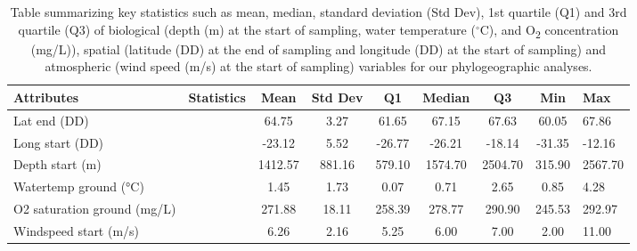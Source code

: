 {\begin{table}[ht]
\centering
\begin{tabular}{|l|l|c|c|c|c|c|c|}
\hline
\textbf{Attributes} & \textbf{Statistics} & \textbf{Mean} & \textbf{Std Dev} & \textbf{Q1} & \textbf{Median} & \textbf{Q3} & \textbf{Min} & \textbf{Max} \\ \hline
Lat end (DD)        &                     & 64.75         & 3.27             & 61.65       & 67.15           & 67.63       & 60.05        & 67.86        \\ \hline
Long start (DD)     &                     & -23.12        & 5.52             & -26.77      & -26.21          & -18.14      & -31.35       & -12.16       \\ \hline
Depth start (m)     &                     & 1412.57       & 881.16           & 579.10      & 1574.70         & 2504.70     & 315.90       & 2567.70      \\ \hline
Watertemp ground (°C) &                   & 1.45          & 1.73             & 0.07        & 0.71            & 2.65        & 0.85         & 4.28         \\ \hline
O2 saturation ground (mg/L) &             & 271.88        & 18.11            & 258.39      & 278.77          & 290.90      & 245.53       & 292.97       \\ \hline
Windspeed start (m/s) &                    & 6.26          & 2.16             & 5.25        & 6.00            & 7.00        & 2.00         & 11.00        \\ \hline
\end{tabular}
\caption{Table summarizing key statistics such as mean, median, standard deviation (Std Dev), 1st quartile (Q1) and 3rd quartile (Q3) of biological (depth (m) at the start of sampling, water temperature ($^\circ$C), and O\textsubscript{2} concentration (mg/L)), spatial (latitude (DD) at the end of sampling and longitude (DD) at the start of sampling) and atmospheric (wind speed (m/s) at the start of sampling) variables for our phylogeographic analyses. \label{fig:tab1}}
\end{table}

}
